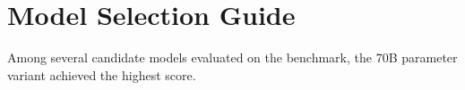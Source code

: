 \section{Model Selection Guide}
Among several candidate models evaluated on the benchmark, the 70B parameter variant achieved the highest score.
